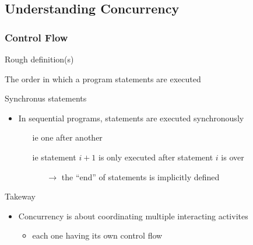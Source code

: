 \documentclass[presentation]{beamer}\mode<presentation>{\usetheme{AMSBolognaFC}}
\begin{document}
\subsection{Understanding Concurrency}

\begin{frame}[allowframebreaks]
    \frametitle{Control Flow}

    \begin{block}{Rough definition(s)}
        \begin{center}
            The order in which a program statements are executed
        \end{center}
    \end{block}

    \begin{block}{Synchronus statements}
        \begin{itemize}
            \item In sequential programs, statements are executed \alert{synchronously}
            \begin{itemize}
                \item[ie] one after another
                \item[ie] statement $i+1$ is only executed after statement $i$ is over
                \begin{itemize}
                    \item[$\rightarrow$] the ``end'' of statements is implicitly defined
                \end{itemize}
            \end{itemize}
        \end{itemize}
    \end{block}

    




    \begin{alertblock}{Takeway}
        \begin{itemize}
            \item Concurrency is about \alert{coordinating} multiple interacting activites
            \begin{itemize}
                \item each one having its own control flow
            \end{itemize}
        \end{itemize}
    \end{alertblock}


\end{frame}
\end{document}

